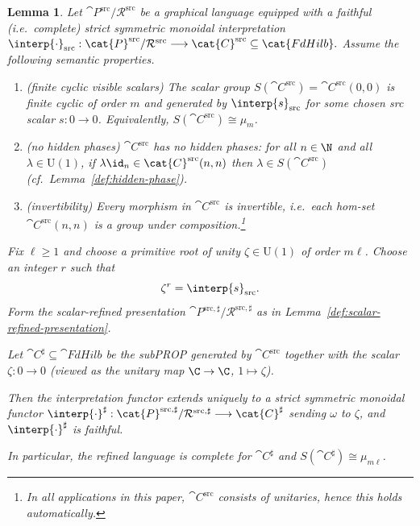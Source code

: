 \documentclass[10pt,a4paper]{article}
\newtheorem{lemma}[theorem]{Lemma}
\def\cref#1{Lemma~\ref{#1}}%
\begin{document}
\begin{lemma}\label{lem:scalar-refinement}
Let $\cat{P}^{\mathrm{src}}/\mathcal{R}^{\mathrm{src}}$ be a graphical language equipped with a
\emph{faithful} (i.e.\ complete) strict symmetric monoidal interpretation
\(
  \interp{\cdot}_{\mathrm{src}} :
  \cat{P}^{\mathrm{src}}/\mathcal{R}^{\mathrm{src}}
  \longrightarrow
   \cat{C}^{\mathrm{src}}
  \subseteq \cat{FdHilb}.
\)
Assume the following semantic properties.
\begin{enumerate}
\item\label{it:scalar-cyclic-app}
(finite cyclic visible scalars)
The scalar group $S( \cat{C}^{\mathrm{src}})= \cat{C}^{\mathrm{src}}(0,0)$ is finite cyclic of order $m$
and generated by $\interp{s}_{\mathrm{src}}$ for some chosen src scalar $s:0\to 0$.
Equivalently, $S( \cat{C}^{\mathrm{src}})\cong \mu_m$.

\item\label{it:no-hidden-phases-app}
(no hidden phases)
$ \cat{C}^{\mathrm{src}}$ has no hidden phases: for all $n\in\N$ and all $\lambda\in\mathrm{U}(1)$,
if $\lambda \id_n\in \cat{C}^{\mathrm{src}}(n,n)$ then $\lambda\in S( \cat{C}^{\mathrm{src}})$
(cf.\ \cref{def:hidden-phase}).

\item\label{it:invertible-app}
(invertibility)
Every morphism in $ \cat{C}^{\mathrm{src}}$ is invertible, i.e.\ each hom-set
$ \cat{C}^{\mathrm{src}}(n,n)$ is a group under composition.\footnote{%
In all applications in this paper, $ \cat{C}^{\mathrm{src}}$ consists of unitaries, hence this holds automatically.}
\end{enumerate}

Fix $\ell\ge 1$ and choose a primitive root of unity $\zeta\in\mathrm{U}(1)$ of order $m\ell$.
Choose an integer $r$ such that
\begin{equation}\label{eq:choose-r}
  \zeta^{r}=\interp{s}_{\mathrm{src}}.
\end{equation}
Form the scalar-refined presentation
$\cat{P}^{\mathrm{src},\sharp}/\mathcal{R}^{\mathrm{src},\sharp}$ as in
\cref{def:scalar-refined-presentation}.

Let $ \cat{C}^{\sharp}\subseteq\cat{FdHilb}$ be the subPROP generated by $ \cat{C}^{\mathrm{src}}$
together with the scalar $\zeta:0\to 0$ (viewed as the unitary map $\C\to\C$, $1\mapsto\zeta$).

Then the interpretation functor extends uniquely to a strict symmetric monoidal functor
\(
  \interp{\cdot}^{\sharp} :
  \cat{P}^{\mathrm{src},\sharp}/\mathcal{R}^{\mathrm{src},\sharp}
  \longrightarrow
   \cat{C}^{\sharp}
\)
sending $\omega$ to $\zeta$, and $\interp{\cdot}^{\sharp}$ is faithful.

In particular, the refined language is complete for $ \cat{C}^{\sharp}$ and
$S( \cat{C}^{\sharp})\cong \mu_{m\ell}$.
\end{lemma}
\end{document}
